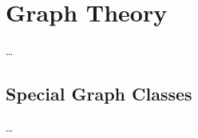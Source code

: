
\usepackage{lipsum}

\geometry{vmargin=0pt}
\def\whereweleftoff{%
    \setcounter{chapter}{0}
    \chapter{Graph Theory}
    \ldots\par
    \setcounter{section}{3}
    \section{Special Graph Classes}
    \ldots\par
}



\whereweleftoff


\leavevmode
{}
\lipsum[1]


